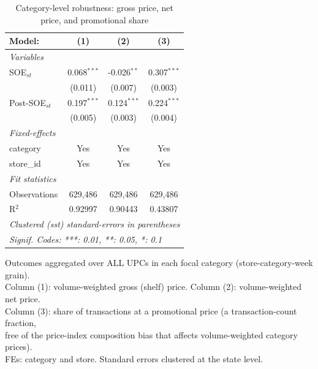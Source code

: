 
\begin{table}[htbp]
   \caption{\label{tab:category_price_promo} Category-level robustness: gross price, net price, and promotional share}
   \centering
   \begin{tabular}{lccc}
      \tabularnewline \midrule \midrule
      Model:          & (1)           & (2)           & (3)\\  
      \midrule
      \emph{Variables}\\
      SOE$_{st}$      & 0.068$^{***}$ & -0.026$^{**}$ & 0.307$^{***}$\\   
                      & (0.011)       & (0.007)       & (0.003)\\   
      Post-SOE$_{st}$ & 0.197$^{***}$ & 0.124$^{***}$ & 0.224$^{***}$\\   
                      & (0.005)       & (0.003)       & (0.004)\\   
      \midrule
      \emph{Fixed-effects}\\
      category        & Yes           & Yes           & Yes\\  
      store\_id       & Yes           & Yes           & Yes\\  
      \midrule
      \emph{Fit statistics}\\
      Observations    & 629,486       & 629,486       & 629,486\\  
      R$^2$           & 0.92997       & 0.90443       & 0.43807\\  
      \midrule \midrule
      \multicolumn{4}{l}{\emph{Clustered (sst) standard-errors in parentheses}}\\
      \multicolumn{4}{l}{\emph{Signif. Codes: ***: 0.01, **: 0.05, *: 0.1}}\\
   \end{tabular}
   
   \par \raggedright 
   Outcomes aggregated over ALL UPCs in each focal category (store-category-week grain).\\
   Column (1): volume-weighted gross (shelf) price. Column (2): volume-weighted net price.\\
   Column (3): share of transactions at a promotional price (a transaction-count fraction,\\
   free of the price-index composition bias that affects volume-weighted category prices).\\
   FEs: category and store. Standard errors clustered at the state level.
\end{table}



